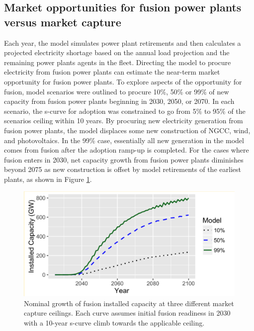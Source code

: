 \documentclass[review]{elsarticle}
\begin{document}
\subsection{Market opportunities for fusion power plants versus market capture}

Each year, the model simulates power plant retirements and then calculates a projected electricity shortage based on the annual load projection and the remaining power plants agents in the fleet. Directing the model to procure electricity from fusion power plants can estimate the near-term market opportunity for fusion power plants. To explore aspects of the opportunity for fusion, model scenarios were outlined to procure 10\%, 50\% or 99\% of new capacity from fusion power plants beginning in 2030, 2050, or 2070. In each scenario, the s-curve for adoption was constrained to go from 5\% to 95\% of the scenarios ceiling within 10 years. By procuring new electricity generation from fusion power plants, the model displaces some new construction of NGCC, wind, and photovoltaics. In the 99\% case, essentially all new generation in the model comes from fusion after the adoption ramp-up is completed. For the cases where fusion enters in 2030, net capacity growth from fusion power plants diminishes beyond 2075 as new construction is offset by model retirements of the earliest plants, as shown in Figure \ref{fig:installed_capacity}.

\begin{figure}
\begin{center}
\includegraphics[width=\textwidth]{Fig4_4.png}
\end{center}
\caption{Nominal growth of fusion installed capacity at three different market capture ceilings. Each curve assumes initial fusion readiness in 2030 with a 10-year s-curve climb towards the applicable ceiling.}
\label{fig:installed_capacity}
\end{figure}
\end{document}
